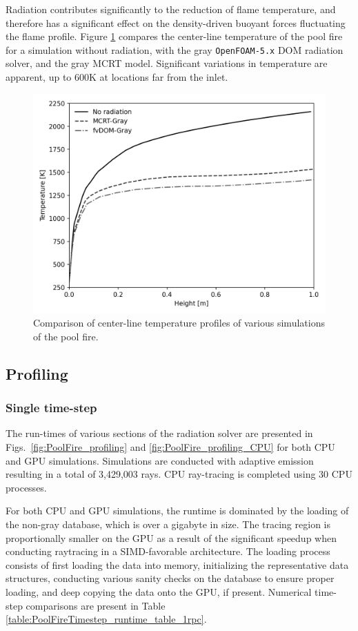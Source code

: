Radiation contributes significantly to the reduction of flame temperature, and therefore has a significant effect on the density-driven buoyant forces fluctuating the flame profile. 
Figure \ref{fig:PoolFire_withandwithoutrad} compares the center-line temperature of the pool fire for a simulation without radiation, with the gray \verb|OpenFOAM-5.x| DOM radiation solver, and the gray MCRT model. Significant variations in temperature are apparent, up to $600$K at locations far from the inlet.


\begin{figure}
\centering
\includegraphics[width=0.7\linewidth]{figures/ch4/PoolFire_WithandWithoutRadiation.png}
\caption{Comparison of center-line temperature profiles of various simulations of the pool fire.}
\label{fig:PoolFire_withandwithoutrad}
\end{figure}

\subsection{Profiling}
\subsubsection{Single time-step}
The run-times of various sections of the radiation solver are presented in Figs.~\ref{fig:PoolFire_profiling} and \ref{fig:PoolFire_profiling_CPU} for both CPU and GPU simulations. Simulations are conducted with adaptive emission resulting in a total of 3,429,003 rays.
CPU ray-tracing is completed using 30 CPU processes. 

For both CPU and GPU simulations, the runtime is dominated by the loading of the non-gray database, which is over a gigabyte in size. 
The tracing region is proportionally smaller on the GPU as a result of the significant speedup when conducting raytracing in a SIMD-favorable architecture.
The loading process consists of first loading the data into memory, initializing the representative data structures, conducting various sanity checks on the database to ensure proper loading, and deep copying the data onto the GPU, if present.
Numerical time-step comparisons are present in Table \ref{table:PoolFireTimestep_runtime_table_1rpc}.

